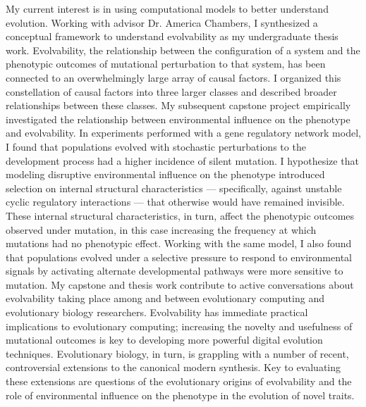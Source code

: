 My current interest is in using computational models to better understand evolution.
Working with advisor Dr. America Chambers, I synthesized a conceptual framework to understand evolvability as my undergraduate thesis work.
Evolvability, the relationship between the configuration of a system and the phenotypic outcomes of mutational perturbation to that system, has been connected to an overwhelmingly large array of causal factors.
I organized this constellation of causal factors into three larger classes and described broader relationships between these classes.
My subsequent capstone project empirically investigated the relationship between environmental influence on the phenotype and evolvability.
In experiments performed with a gene regulatory network model, I found that populations evolved with stochastic perturbations to the development process had a higher incidence of silent mutation.
I hypothesize that modeling disruptive environmental influence on the phenotype introduced selection on internal structural characteristics --- specifically, against unstable cyclic regulatory interactions --- that otherwise would have remained invisible.
These internal structural characteristics, in turn, affect the phenotypic outcomes observed under mutation, in this case increasing the frequency at which mutations had no phenotypic effect.
Working with the same model, I also found that populations evolved under a selective pressure to respond to environmental signals by activating alternate developmental pathways were more sensitive to mutation.
My capstone and thesis work contribute to active conversations about evolvability taking place among and between evolutionary computing and evolutionary biology researchers.
Evolvability has immediate practical implications to evolutionary computing;
increasing the novelty and usefulness of mutational outcomes is key to developing more powerful digital evolution techniques.
Evolutionary biology, in turn, is grappling with a number of recent, controversial extensions to the canonical modern synthesis.
Key to evaluating these extensions are questions of the evolutionary origins of evolvability and the role of environmental influence on the phenotype in the evolution of novel traits.
